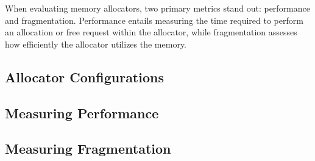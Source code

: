 
When evaluating memory allocators, two primary metrics stand out: performance and fragmentation. Performance entails measuring the time required to perform an allocation or free request within the allocator, while fragmentation assesses how efficiently the allocator utilizes the memory.

\subsection{Allocator Configurations}


\iffalse

class BaseConfig {
public:
  static const size_t FirstLevelIndex = 32;
  static const size_t SecondLevelIndexLog2 = 5;
  static const size_t MBS = 32;
  static const bool UseSecondLevels = true;
  static const bool DeferredCoalescing = false;
  static const size_t BlockHeaderLength = BLOCK_HEADER_LENGTH;
};

class ZOptimizedConfig {
public:
  static const size_t FirstLevelIndex = 14;
  static const size_t SecondLevelIndexLog2 = 2;
  static const size_t MBS = 16;
  static const bool UseSecondLevels = false;
  static const bool DeferredCoalescing = true;
  static const size_t BlockHeaderLength = BLOCK_HEADER_LENGTH_SMALL;
};


\fi

\subsection{Measuring Performance}



\subsection{Measuring Fragmentation}

